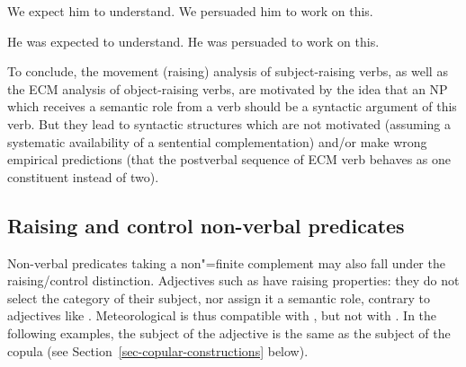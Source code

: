 \begin{exe}
\ex
\begin{xlist} \label{pro}
\ex We expect him to understand.
\ex  We persuaded him to work on this.
\end{xlist}
\ex \begin{xlist} \label{passive}
\ex  He was expected to understand.
\ex  He was persuaded to work on this.
\end{xlist}
	
\end{exe}


To conclude, the movement (raising) analysis of subject-raising verbs, as well as the ECM analysis of object-raising verbs, are motivated by the idea that an NP which receives a semantic role from a verb should be a syntactic argument of this verb.
But they lead to syntactic structures which are not motivated (assuming a systematic availability of a sentential complementation) and/or make wrong empirical predictions (that the postverbal sequence of ECM verb behaves as one constituent instead of two).
 
\subsection{Raising and control non-verbal predicates}\label{nonverbal}

Non-verbal predicates taking a non"=finite complement may also fall under the raising/control distinction.  Adjectives such as  have raising properties: they do not select the category of their subject, nor assign it a semantic role, contrary to adjectives like . Meteorological  is thus compatible with , but not with . In the following examples, the subject of the adjective is the same as the subject of the copula (see Section~\ref{sec-copular-constructions} below).

\eal
{}
\zl

